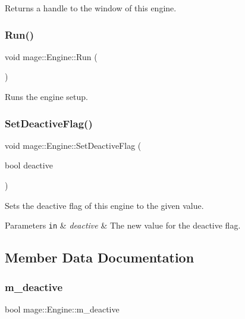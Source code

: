 Returns a handle to the window of this engine. \hypertarget{classmage_1_1_engine_afdc05e214d3f47a6ea3a40dfffd86f80}{}\label{classmage_1_1_engine_afdc05e214d3f47a6ea3a40dfffd86f80} 
\subsubsection{\texorpdfstring{Run()}{Run()}}
{\footnotesize\ttfamily void mage\+::\+Engine\+::\+Run (\begin{DoxyParamCaption}{ }\end{DoxyParamCaption})}

Runs the engine setup. \hypertarget{classmage_1_1_engine_a942bfa9892fa79bb1068d7c7ec4e6732}{}\label{classmage_1_1_engine_a942bfa9892fa79bb1068d7c7ec4e6732} 
\subsubsection{\texorpdfstring{Set\+Deactive\+Flag()}{SetDeactiveFlag()}}
{\footnotesize\ttfamily void mage\+::\+Engine\+::\+Set\+Deactive\+Flag (\begin{DoxyParamCaption}\item[{bool}]{deactive }\end{DoxyParamCaption})}

Sets the deactive flag of this engine to the given value.


\begin{DoxyParams}[1]{Parameters}
\mbox{\tt in}  & {\em deactive} & The new value for the deactive flag. \\
\hline
\end{DoxyParams}


\subsection{Member Data Documentation}
\hypertarget{classmage_1_1_engine_ab8a4b0157403708ae7d1d018a95b4c63}{}\label{classmage_1_1_engine_ab8a4b0157403708ae7d1d018a95b4c63} 
\subsubsection{\texorpdfstring{m\+\_\+deactive}{m\_deactive}}
{\footnotesize\ttfamily bool mage\+::\+Engine\+::m\+\_\+deactive\hspace{0.3cm}{\ttfamily [private]}}

